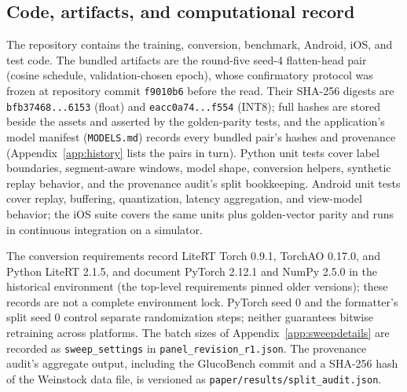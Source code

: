 \documentclass[10pt,twocolumn]{article}
\begin{document}
\subsection{Code, artifacts, and computational record}

The repository contains the training, conversion, benchmark, Android, iOS,
and test code. The bundled artifacts are the round-five seed-4
flatten-head pair (cosine schedule, validation-chosen epoch), whose
confirmatory protocol was frozen at repository commit \texttt{f9010b6}
before the read. Their SHA-256 digests are \texttt{bfb37468...6153}
(float) and \texttt{eacc0a74...f554} (INT8); full hashes are stored beside
the assets and asserted by the golden-parity tests, and the application's
model manifest (\texttt{MODELS.md}) records every bundled pair's hashes
and provenance (Appendix~\ref{app:history} lists the pairs in turn).
Python unit tests cover label boundaries, segment-aware windows, model
shape, conversion helpers, synthetic replay behavior, and the provenance
audit's split bookkeeping. Android unit tests cover replay, buffering,
quantization, latency aggregation, and view-model behavior; the iOS suite
covers the same units plus golden-vector parity and runs in continuous
integration on a simulator.

The conversion requirements record LiteRT Torch 0.9.1, TorchAO 0.17.0, and
Python LiteRT 2.1.5, and document PyTorch 2.12.1 and NumPy 2.5.0 in the
historical environment (the top-level requirements pinned older versions);
these records are not a complete environment lock. PyTorch seed 0 and the
formatter's split seed 0 control separate randomization steps; neither
guarantees bitwise retraining across platforms. The batch sizes of
Appendix~\ref{app:sweepdetails} are recorded as \texttt{sweep\_settings}
in \texttt{panel\_revision\_r1.json}. The
provenance audit's aggregate output, including the GlucoBench commit and a
SHA-256 hash of the Weinstock data file, is versioned as
\texttt{paper/results/split\_audit.json}.
\end{document}
